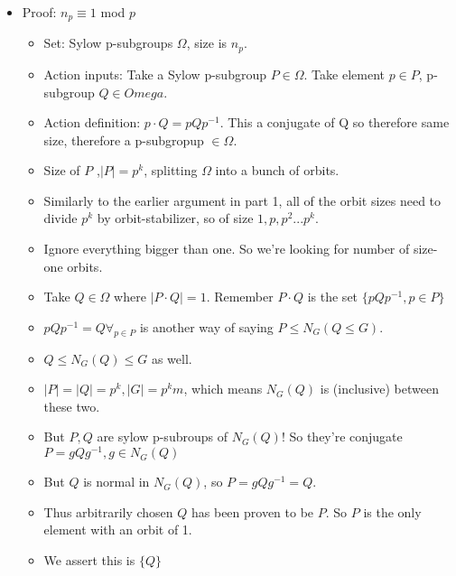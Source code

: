 \documentclass[11pt, oneside]{article}   	%
\begin{document}
\begin{itemize}
\item Proof: $n_p \equiv 1$ mod $p$
\begin{itemize}
\item Set: Sylow p-subgroups $\Omega$, size is $n_p$.
\item Action inputs: Take a Sylow p-subgroup $P \in \Omega$.  Take element $p \in P$, p-subgroup $Q \in Omega$.  
\item Action definition: $p \cdot Q = pQp^{-1}$.  This a conjugate of Q so therefore same size, therefore a p-subgropup $\in \Omega$.
\item Size of $P$ ,$|P| = p^k$, splitting $\Omega$ into a bunch of orbits.
\item Similarly to the earlier argument in part 1, all of the orbit sizes need to divide $p^k$ by orbit-stabilizer, so of size $1, p, p^2... p^k$.  
\item Ignore everything bigger than one.  So we're looking for number of size-one orbits.
\item Take $Q \in \Omega$ where $|P \cdot Q| = 1$.  Remember $ P \cdot Q$ is the set $\{pQp^{-1}, p \in P\}$
\item $pQp^{-1} = Q \forall_{p \in P}$ is another way of saying $P \leq N_G(Q \leq G)$.
\item $Q \leq N_G(Q) \leq G$ as well.  
\item $|P| = |Q| = p^k, |G| = p^km$, which means $N_G(Q)$ is (inclusive) between these two.
\item But $P, Q$ are sylow p-subroups of $N_G(Q)$!  So they're conjugate $P = gQg^{-1}, g \in N_G(Q)$
\item But $Q$ is normal in $N_G(Q)$, so $P = gQg^{-1} = Q$.  
\item Thus arbitrarily chosen $Q$ has been proven to be $P$.  So $P$ is the only element with an orbit of 1.
\item We assert this is $\{Q\}$
\end{itemize}
\end{itemize}
\end{document}
